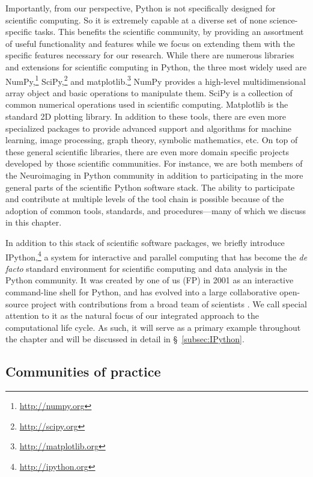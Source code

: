\documentclass[ChapterTOCs,krantz2]{krantz} %
\begin{document}
Importantly, from our perspective, Python is not specifically designed for
scientific computing.  So it is extremely capable at a diverse set of none
science-specific tasks. This benefits the scientific community, by providing an
assortment of useful functionality and features while we focus on extending
them with the specific features necessary for our research.  While there are
numerous libraries and extensions for scientific computing in Python, the three
most widely used are NumPy,\footnote{\url{http://numpy.org}}
SciPy,\footnote{\url{http://scipy.org}} and
matplotlib.\footnote{\url{http://matplotlib.org}}  NumPy provides a high-level
multidimensional array object and basic operations to manipulate them. SciPy is
a collection of common numerical operations used in scientific computing.
Matplotlib \cite{hunter2007matplotlib, hunter2012matplotlib} is the standard 2D
plotting library. In addition to these tools, there are even more specialized
packages to provide advanced support and algorithms for machine learning, image
processing, graph theory, symbolic mathematics, etc. On top of these general
scientific libraries, there are even more domain specific projects developed by
those scientific communities. For instance, we are both members of the
Neuroimaging in Python \cite{MIL-BRE:2007} community in addition to
participating in the more general parts of the scientific Python software
stack. The ability to participate and contribute at multiple levels of the tool
chain is possible because of the adoption of common tools, standards, and
procedures---many of which we discuss in this chapter.

In addition to this stack of scientific software packages, we briefly
introduce IPython,\footnote{\url{http://ipython.org}} a system for interactive
and parallel computing that has become the \emph{de facto} standard environment
for scientific computing and data analysis in the Python community.  It was
created by one of us (FP) in 2001 as an interactive command-line shell for
Python, and has evolved into a large collaborative open-source project with
contributions from a broad team of scientists \cite{PER-GRA:2007}. We call
special attention to it as the natural focus of our integrated approach to the
computational life cycle. As such, it will serve as a primary example
throughout the chapter and will be discussed in detail in §~\ref{subsec:IPython}.

\subsection{\label{subsec:community}Communities of practice}
\end{document}
